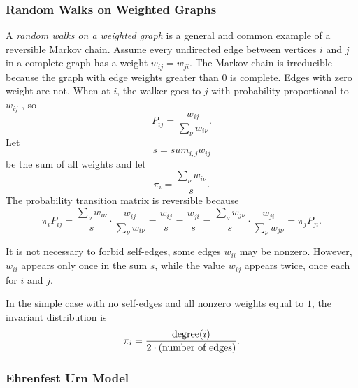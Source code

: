 \documentclass[12pt]{article}
\begin{document}
\subsubsection*{Random Walks on Weighted Graphs} A \emph{random walks on
a weighted graph}%
%
is a general and common example of a reversible Markov chain.  Assume
every undirected edge between vertices \( i \) and \( j \) in a complete
graph has a weight \( w_{ij} = w_{ji} \).  The Markov chain is
irreducible because the graph with edge weights greater than \( 0 \) is
complete.  Edges with zero weight are not.  When at \( i \), the walker
goes to \( j \) with probability proportional to \( w_{ij} \) , so
\[
    P_{ij} = \frac{w_{ij}}{\sum_{\nu} w_{i\nu}}.
\] Let
\[
    s = sum_{i,j} w_{ij}
\] be the sum of all weights and let
\[
    \pi_i = \frac{\sum_{\nu} w_{i\nu}}{s}.
\] The probability transition matrix is reversible because
\[
    \pi_i P_{ij} = \frac{\sum_{\nu} w_{i\nu}}{s} \cdot \frac{w_{ij}}{\sum_
    {\nu} w_{i\nu}} = \frac{w_{ij}}{s} = \frac{w_{ji}}{s} = \frac{\sum_{\nu}
    w_{j\nu}}{s} \cdot \frac{w_{ji}}{\sum_{\nu} w_{j\nu}} = \pi_j P_{ji}.
\]

It is not necessary to forbid self-edges, some edges \( w_{ii} \) may be
nonzero.  However, \( w_{ii} \) appears only once in the sum \( s \),
while the value \( w_{ij} \) appears twice, once each for \( i \) and \(
j \).

In the simple case with no self-edges and all nonzero weights equal to \(
1 \), the invariant distribution is
\[
    \pi_i = \frac{%
    \operatorname{degree}
    (i)}{2 \cdot (\text{number of edges})}.
\]

\subsubsection*{Ehrenfest Urn Model}
\end{document}
